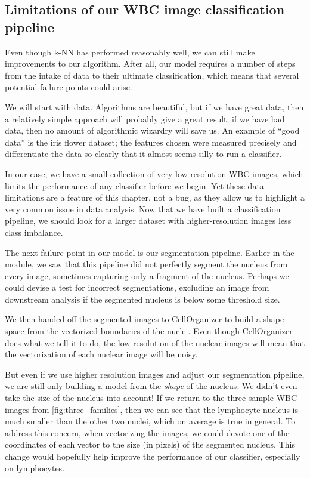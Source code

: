 \FloatBarrier
{}
\subsection{Limitations of our WBC image classification pipeline}

Even though k-NN has performed reasonably well, we can still make improvements to our algorithm. After all, our model requires a number of steps from the intake of data to their ultimate classification, which means that several potential failure points could arise.

We will start with data. Algorithms are beautiful, but if we have great data, then a relatively simple approach will probably give a great result; if we have bad data, then no amount of algorithmic wizardry will save us. An example of ``good data'' is the iris flower dataset; the features chosen were measured precisely and differentiate the data so clearly that it almost seems silly to run a classifier.

In our case, we have a small collection of very low resolution WBC images, which limits the performance of any classifier before we begin. Yet these data limitations are a feature of this chapter, not a bug, as they allow us to highlight a very common issue in data analysis. Now that we have built a classification pipeline, we should look for a larger dataset with higher-resolution images less class imbalance.

The next failure point in our model is our segmentation pipeline. Earlier in the module, we saw that this pipeline did not perfectly segment the nucleus from every image, sometimes capturing only a fragment of the nucleus. Perhaps we could devise a test for incorrect segmentations, excluding an image from downstream analysis if the segmented nucleus is below some threshold size.

We then handed off the segmented images to CellOrganizer to build a shape space from the vectorized boundaries of the nuclei. Even though CellOrganizer does what we tell it to do, the low resolution of the nuclear images will mean that the vectorization of each nuclear image will be noisy.

But even if we use higher resolution images and adjust our segmentation pipeline, we are still only building a model from the \textit{shape} of the nucleus. We didn't even take the size of the nucleus into account! If we return to the three sample WBC images from \autoref{fig:three_families}, then we can see that the lymphocyte nucleus is much smaller than the other two nuclei, which on average is true in general. To address this concern, when vectorizing the images, we could devote one of the coordinates of each vector to the size (in pixels) of the segmented nucleus. This change would hopefully help improve the performance of our classifier, especially on lymphocytes.\\

